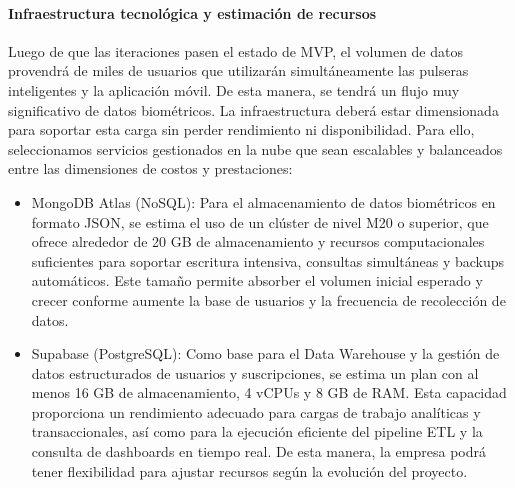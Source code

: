 \paragraph{Infraestructura tecnológica y estimación de recursos}
Luego de que las iteraciones pasen el estado de MVP, el volumen de datos provendrá de miles de usuarios que utilizarán simultáneamente las pulseras inteligentes y la aplicación móvil. De esta manera, se tendrá un flujo muy significativo de datos biométricos. La infraestructura deberá estar dimensionada para soportar esta carga sin perder rendimiento ni disponibilidad.
Para ello, seleccionamos servicios gestionados en la nube que sean escalables y balanceados entre las dimensiones de costos y prestaciones:
\begin{itemize}
    \item MongoDB Atlas (NoSQL): Para el almacenamiento de datos biométricos en formato JSON, se estima el uso de un clúster de nivel M20 o superior, que ofrece alrededor de 20 GB de almacenamiento y recursos computacionales suficientes para soportar escritura intensiva, consultas simultáneas y backups automáticos. Este tamaño permite absorber el volumen inicial esperado y crecer conforme aumente la base de usuarios y la frecuencia de recolección de datos.
    \item Supabase (PostgreSQL): Como base para el Data Warehouse y la gestión de datos estructurados de usuarios y suscripciones, se estima un plan con al menos 16 GB de almacenamiento, 4 vCPUs y 8 GB de RAM. Esta capacidad proporciona un rendimiento adecuado para cargas de trabajo analíticas y transaccionales, así como para la ejecución eficiente del pipeline ETL y la consulta de dashboards en tiempo real. De esta manera, la empresa podrá tener flexibilidad para ajustar recursos según la evolución del proyecto.
\end{itemize}


